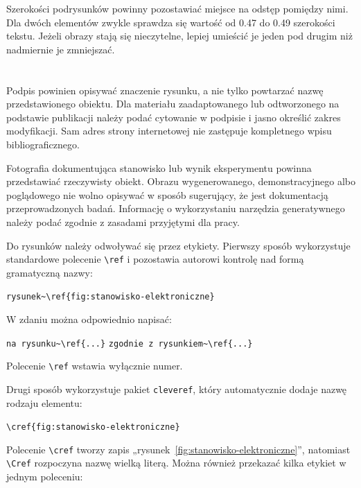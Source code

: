 Szerokości podrysunków powinny pozostawiać miejsce na odstęp pomiędzy nimi. Dla dwóch elementów zwykle sprawdza się wartość od \num{0.47} do \num{0.49} szerokości tekstu. Jeżeli obrazy stają się nieczytelne, lepiej umieścić je jeden pod drugim niż nadmiernie je zmniejszać.

\section{}

Podpis powinien opisywać znaczenie rysunku, a nie tylko powtarzać nazwę przedstawionego obiektu. Dla materiału zaadaptowanego lub odtworzonego na podstawie publikacji należy podać cytowanie w podpisie i jasno określić zakres modyfikacji. Sam adres strony internetowej nie zastępuje kompletnego wpisu bibliograficznego.

Fotografia dokumentująca stanowisko lub wynik eksperymentu powinna przedstawiać rzeczywisty obiekt. Obrazu wygenerowanego, demonstracyjnego albo poglądowego nie wolno opisywać w sposób sugerujący, że jest dokumentacją przeprowadzonych badań. Informację o wykorzystaniu narzędzia generatywnego należy podać zgodnie z zasadami przyjętymi dla pracy.

Do rysunków należy odwoływać się przez etykiety. Pierwszy sposób wykorzystuje standardowe polecenie \verb|\ref| i pozostawia autorowi kontrolę nad formą gramatyczną nazwy:

\begin{center}
\verb|rysunek~\ref{fig:stanowisko-elektroniczne}|
\end{center}

W zdaniu można odpowiednio napisać:

\begin{center}
\verb|na rysunku~\ref{...}|
\qquad
\verb|zgodnie z rysunkiem~\ref{...}|
\end{center}

Polecenie \verb|\ref| wstawia wyłącznie numer.

Drugi sposób wykorzystuje pakiet \texttt{cleveref}, który automatycznie dodaje nazwę rodzaju elementu:

\begin{center}
\verb|\cref{fig:stanowisko-elektroniczne}|
\end{center}

Polecenie \verb|\cref| tworzy zapis „rysunek~\ref{fig:stanowisko-elektroniczne}”, natomiast \verb|\Cref| rozpoczyna nazwę wielką literą. Można również przekazać kilka etykiet w jednym poleceniu:

